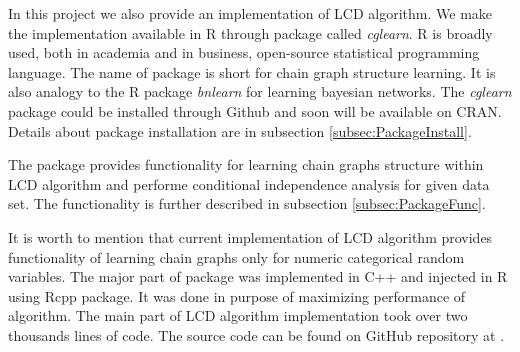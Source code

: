%
%


In this project we also provide an implementation of LCD algorithm. We make the implementation available in R through package called \textit{cglearn}.
R is broadly used, both in academia and in business, open-source statistical programming language. The name of package is short for chain graph structure learning.
It is also analogy to the R package \textit{bnlearn} for learning bayesian networks.
The \textit{cglearn} package could be installed through Github and soon will be available on CRAN. Details about package installation are in subsection \ref{subsec:PackageInstall}.

The package provides functionality for learning chain graphs structure within LCD algorithm and performe conditional independence analysis for given 
data set. The functionality is further described in subsection \ref{subsec:PackageFunc}.

It is worth to mention that current implementation of LCD algorithm provides functionality of learning chain graphs only for numeric categorical random variables.
The major part of package was implemented in C++ and injected in R using Rcpp package. It was done in purpose of maximizing performance of algorithm. 
The main part of LCD algorithm implementation took over two thousands lines of code. The source code can be found on GitHub repository at \cite{GIT}.












